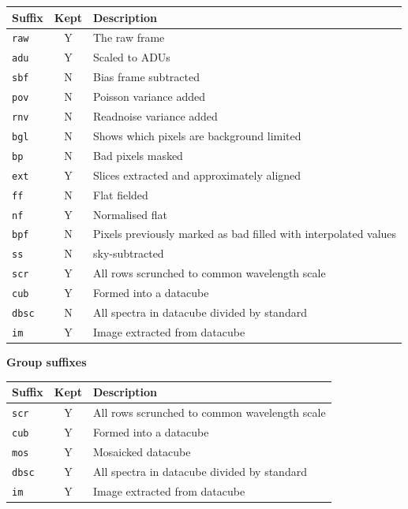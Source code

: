 \documentclass[twoside,11pt]{article}
\renewcommand{\_}{\texttt{\symbol{95}}}
\begin{document}
\begin{tabular}{l c l}
\hline
Suffix & Kept & Description \hspace{9cm}  \\
\hline
{\tt \_raw} & Y & The raw frame\\
{\tt \_adu} & Y & Scaled to ADUs\\
{\tt \_sbf} & N & Bias frame subtracted\\
{\tt \_pov} & N & Poisson variance added\\
{\tt \_rnv} & N & Readnoise variance added\\
{\tt \_bgl} & N & Shows which pixels are background limited\\
{\tt \_bp}  & N & Bad pixels masked\\
{\tt \_ext} & Y & Slices extracted and approximately aligned\\
{\tt \_ff}  & N & Flat fielded\\
{\tt \_nf}  & Y & Normalised flat\\
{\tt \_bpf} & N & Pixels previously marked as bad filled with
interpolated values\\
{\tt \_ss}  & N & sky-subtracted\\
{\tt \_scr} & Y & All rows scrunched to common wavelength scale\\
{\tt \_cub} & Y & Formed into a datacube\\
{\tt \_dbsc} & N & All spectra in datacube divided by standard\\
{\tt \_im}  & Y & Image extracted from datacube\\
\hline 
\end{tabular}   

\vspace{0.5cm}

\textbf{Group suffixes}

\vspace{0.2cm}

\begin{tabular}{l c l}
\hline
Suffix & Kept & Description \hspace{9cm} \\
\hline
{\tt \_scr} & Y & All rows scrunched to common wavelength scale\\
{\tt \_cub} & Y & Formed into a datacube\\
{\tt \_mos} & Y & Mosaicked datacube\\
{\tt \_dbsc} & Y & All spectra in datacube divided by standard\\
{\tt \_im}  & Y & Image extracted from datacube\\
\hline 
\end{tabular} 
\end{document}
